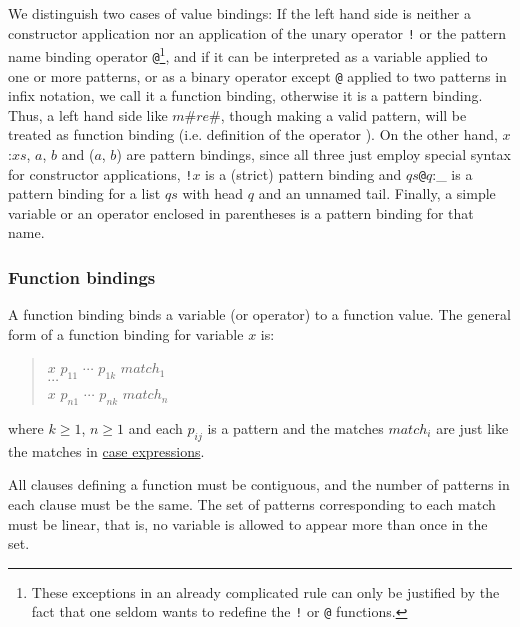 We distinguish two cases of value bindings: If the left hand side is neither a constructor application nor an application of the unary operator \texttt{!} or the pattern name binding operator \texttt{@}\footnote{These exceptions in an already complicated rule can only be justified by the fact that one seldom wants to redefine the \texttt{!} or \texttt{@} functions.}, and if it can be interpreted as a variable applied to one or more patterns, or as a binary operator except \texttt{@} applied to two patterns in infix notation, we call it a function binding, otherwise it is a pattern binding. Thus, a left hand side like $m$\#$re$\#, though making a valid pattern, will be treated as function binding (i.e. definition of the operator  \texttt{}). On the other hand, $x$:$xs$, \bracka{}$a$, $b$\brackz{} and ($a$, $b$) are pattern bindings, since all three just employ special syntax for constructor applications, \texttt{!}$x$ is a (strict) pattern binding and $qs$\texttt{@}$q$:\_ is a pattern binding for a list $qs$ with head $q$ and an unnamed tail. Finally, a simple variable or an operator enclosed in parentheses is a pattern binding for that name.

\subsubsection{Function bindings} \label{fundef}

A function binding binds a variable (or operator) to a function value.
The general form of a function binding for variable $x$ is:
\begin{quote}
\begin{flushleft}
$x$ $p_{11}$ $\cdots$ $p_{1k}$ $match_1$\\
$\cdots$\\
$x$ $p_{n1}$ $\cdots$ $p_{nk}$ $match_n$\\
\end{flushleft}
\end{quote}
where $k\ge 1$, $n\ge 1$ and each $p_{ij}$ is a pattern and the matches $match_i$ are just like the matches in \hyperref[caseex]{case expressions}.

All clauses defining a function must be contiguous, and the number of patterns in each clause must be the same. The set of patterns corresponding to each match must be linear, that is, no variable is allowed to appear more than once in the set.



